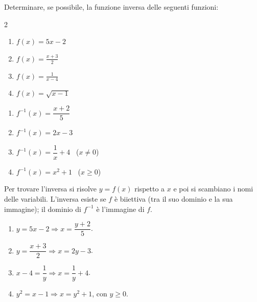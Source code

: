 
\begin{question}[ID=4.3, subtitle={Funzione inversa — serie 3}, difficulty=media, tags={funzioni,inversa}]
Determinare, se possibile, la funzione inversa delle seguenti funzioni:

\begin{center}\begin{minipage}{0.92\linewidth}
\begin{multicols}{2}
\begin{enumerate}[leftmargin=3.2cm]
\item $f(x)=5x-2$
\item $f(x)=\frac{x+3}{2}$
\item $f(x)=\frac{1}{x-4}$
\item $f(x)=\sqrt{x-1}$
\end{enumerate}
\end{multicols}
\end{minipage}\end{center}
\begin{solution}
\begin{enumerate}
    \item $f^{-1}(x)=\dfrac{x+2}{5}$
    \item $f^{-1}(x)=2x-3$
    \item $f^{-1}(x)=\dfrac1x+4$ \ ($x\neq0$)
    \item $f^{-1}(x)=x^2+1$ \ ($x\geq0$)
\end{enumerate}
\end{solution}
\begin{explanation}
Per trovare l'inversa si risolve $y=f(x)$ rispetto a $x$ e poi si scambiano i nomi delle variabili. L'inversa esiste se $f$ è biiettiva (tra il suo dominio e la sua immagine); il dominio di $f^{-1}$ è l'immagine di $f$.
\begin{enumerate}
    \item $y=5x-2 \Rightarrow x=\dfrac{y+2}{5}$.
    \item $y=\dfrac{x+3}{2} \Rightarrow x=2y-3$.
    \item $x-4=\dfrac1y \Rightarrow x=\dfrac1y+4$.
    \item $y^2=x-1 \Rightarrow x=y^2+1$, con $y\geq0$.
\end{enumerate}
\end{explanation}

\end{question}


